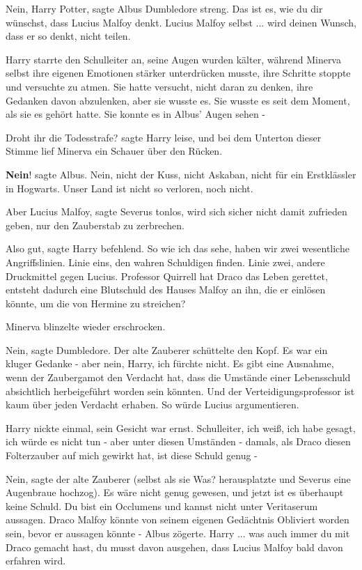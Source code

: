 \glqq{}Nein, Harry Potter\grqq{}, sagte Albus Dumbledore streng. \glqq{}Das ist
es, wie du dir wünschst, dass Lucius Malfoy denkt. Lucius Malfoy selbst ... wird
deinen Wunsch, dass er so denkt, nicht teilen.\grqq{}

Harry starrte den Schulleiter an, seine Augen wurden kälter, während Minerva
selbst ihre eigenen Emotionen stärker unterdrücken musste, ihre Schritte stoppte
und versuchte zu atmen. Sie hatte versucht, nicht daran zu denken, ihre Gedanken
davon abzulenken, aber sie wusste es. Sie wusste es seit dem Moment, als sie es
gehört hatte. Sie konnte es in Albus' Augen sehen -

\glqq{}Droht ihr die Todesstrafe?\grqq{} sagte Harry leise, und bei dem Unterton
dieser Stimme lief Minerva ein Schauer über den Rücken.

\glqq{}\textbf{Nein}!\grqq{} sagte Albus. \glqq{}Nein, nicht der Kuss, nicht
Askaban, nicht für ein Erstklässler in Hogwarts. Unser Land ist nicht so
verloren, noch nicht.\grqq{}

\glqq{}Aber Lucius Malfoy\grqq{}, sagte Severus tonlos, \glqq{}wird sich sicher
nicht damit zufrieden geben, nur den Zauberstab zu zerbrechen.\grqq{}

\glqq{}Also gut\grqq{}, sagte Harry befehlend. \glqq{}So wie ich das sehe, haben
wir zwei wesentliche Angriffslinien. Linie eins, den wahren Schuldigen finden.
Linie zwei, andere Druckmittel gegen Lucius. Professor Quirrell hat Draco das
Leben gerettet, entsteht dadurch eine Blutschuld des Hauses Malfoy an ihn, die
er einlösen könnte, um die von Hermine zu streichen?\grqq{}

Minerva blinzelte wieder erschrocken.

\glqq{}Nein\grqq{}, sagte Dumbledore. Der alte Zauberer schüttelte den Kopf.
\glqq{}Es war ein kluger Gedanke - aber nein, Harry, ich fürchte nicht. Es gibt
eine Ausnahme, wenn der Zaubergamot den Verdacht hat, dass die Umstände einer
Lebensschuld absichtlich herbeigeführt worden sein könnten. Und der
Verteidigungsprofessor ist kaum über jeden Verdacht erhaben. So würde Lucius
argumentieren.\grqq{}

Harry nickte einmal, sein Gesicht war ernst. \glqq{}Schulleiter, ich weiß, ich
habe gesagt, ich würde es nicht tun - aber unter diesen Umständen - damals, als
Draco diesen Folterzauber auf mich gewirkt hat, ist diese Schuld genug -\grqq{}

\glqq{}Nein\grqq{}, sagte der alte Zauberer (selbst als sie \glqq{}Was?\grqq{}
herausplatzte und Severus eine Augenbraue hochzog). \glqq{}Es wäre nicht genug
gewesen, und jetzt ist es überhaupt keine Schuld. Du bist ein Occlumens und
kannst nicht unter Veritaserum aussagen. Draco Malfoy könnte von seinem eigenen
Gedächtnis Obliviert worden sein, bevor er aussagen könnte -\grqq{} Albus
zögerte. \glqq{}Harry ... was auch immer du mit Draco gemacht hast, du musst
davon ausgehen, dass Lucius Malfoy bald davon erfahren wird.\grqq{}

